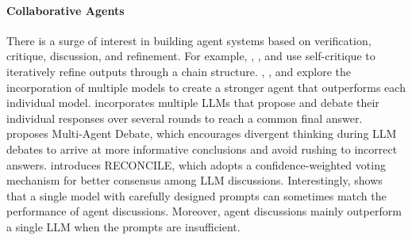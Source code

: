\paragraph{Collaborative Agents} There is a surge of interest in building agent systems based on verification, critique, discussion, and refinement. For example, \citet{stechly2023gpt}, \citet{valmeekam2023can}, and \citet{madaan2024self} use self-critique to iteratively refine outputs through a chain structure. \citet{madaan2024self}, \citet{chen2024moa}, and \citet{wang2024mixture} explore the incorporation of multiple models to create a stronger agent that outperforms each individual model. \citet{du2023improving} incorporates multiple LLMs that propose and debate their individual responses over several rounds to reach a common final answer. \citet{liang2023encouraging} proposes Multi-Agent Debate, which encourages divergent thinking during LLM debates to arrive at more informative conclusions and avoid rushing to incorrect answers. \citet{chen2023reconcile} introduces RECONCILE, which adopts a confidence-weighted voting mechanism for better consensus among LLM discussions. Interestingly, \citet{wang2024rethinking} shows that a single model with carefully designed prompts can sometimes match the performance of agent discussions. Moreover, agent discussions mainly outperform a single LLM when the prompts are insufficient.